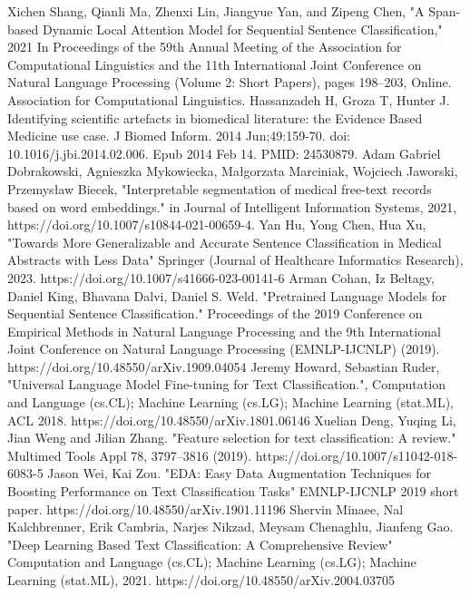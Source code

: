\documentclass[12pt,a4paper]{report}     %
\begin{document}
\begin{normalsize}
{{\begin{normalsize}
{{\begin{thebibliography}{9}
 Xichen Shang, Qianli Ma, Zhenxi Lin, Jiangyue Yan, and Zipeng Chen, "A Span-based Dynamic Local Attention Model for Sequential Sentence Classification," 2021 In Proceedings of the 59th Annual Meeting of the Association for Computational Linguistics and the 11th International Joint Conference on Natural Language Processing (Volume 2: Short Papers), pages 198–203, Online. Association for Computational Linguistics.
 Hassanzadeh H, Groza T, Hunter J. Identifying scientific artefacts in biomedical literature: the Evidence Based Medicine use case. J Biomed Inform. 2014 Jun;49:159-70. doi: 10.1016/j.jbi.2014.02.006. Epub 2014 Feb 14. PMID: 24530879.
 Adam Gabriel Dobrakowski, Agnieszka Mykowiecka, Małgorzata Marciniak, Wojciech Jaworski, Przemysław Biecek, "Interpretable segmentation of medical free-text records based on word embeddings." in Journal of Intelligent Information Systems, 2021, 
https://doi.org/10.1007/s10844-021-00659-4.
 Yan Hu, Yong Chen, Hua Xu, "Towards More Generalizable and Accurate Sentence Classification in Medical Abstracts with Less Data" Springer (Journal of Healthcare Informatics Research), 2023. 
https://doi.org/10.1007/s41666-023-00141-6
 Arman Cohan, Iz Beltagy, Daniel King, Bhavana Dalvi, Daniel S. Weld. "Pretrained Language Models for Sequential Sentence Classification." Proceedings of the 2019 Conference on Empirical Methods in Natural Language Processing and the 9th International Joint Conference on Natural Language Processing (EMNLP-IJCNLP) (2019). https://doi.org/10.48550/arXiv.1909.04054
 Jeremy Howard, Sebastian Ruder, "Universal Language Model Fine-tuning for Text Classification.", Computation and Language (cs.CL); Machine Learning (cs.LG); Machine Learning (stat.ML), ACL 2018.
https://doi.org/10.48550/arXiv.1801.06146
 Xuelian Deng, Yuqing Li, Jian Weng and Jilian Zhang. "Feature selection for text classification: A review." Multimed Tools Appl 78, 3797–3816 (2019).
https://doi.org/10.1007/s11042-018-6083-5
 Jason Wei, Kai Zou. "EDA: Easy Data Augmentation Techniques for Boosting Performance on Text Classification Tasks" EMNLP-IJCNLP 2019 short paper. https://doi.org/10.48550/arXiv.1901.11196
 Shervin Minaee, Nal Kalchbrenner, Erik Cambria, Narjes Nikzad, Meysam Chenaghlu, Jianfeng Gao. "Deep Learning Based Text Classification: A Comprehensive Review" Computation and Language (cs.CL); Machine Learning (cs.LG); Machine Learning (stat.ML), 2021. 
https://doi.org/10.48550/arXiv.2004.03705



\end{thebibliography}}}
\end{normalsize}}}
\end{normalsize}
\end{document}
